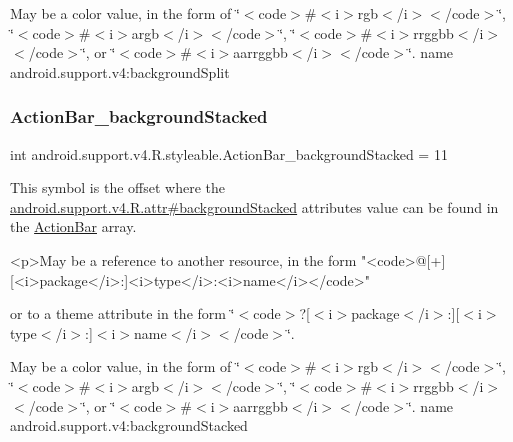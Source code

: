 May be a color value, in the form of \char`\"{}$<$code$>$\#$<$i$>$rgb$<$/i$>$$<$/code$>$\char`\"{}, \char`\"{}$<$code$>$\#$<$i$>$argb$<$/i$>$$<$/code$>$\char`\"{}, \char`\"{}$<$code$>$\#$<$i$>$rrggbb$<$/i$>$$<$/code$>$\char`\"{}, or \char`\"{}$<$code$>$\#$<$i$>$aarrggbb$<$/i$>$$<$/code$>$\char`\"{}.  name android.\+support.\+v4\+:background\+Split \mbox{\label{classandroid_1_1support_1_1v4_1_1R_1_1styleable_aacf7d90f6edcba30a3c2043eec5cef02}} 
\subsubsection{\texorpdfstring{Action\+Bar\+\_\+background\+Stacked}{ActionBar\_backgroundStacked}}
{\footnotesize\ttfamily int android.\+support.\+v4.\+R.\+styleable.\+Action\+Bar\+\_\+background\+Stacked = 11\hspace{0.3cm}{\ttfamily [static]}}

This symbol is the offset where the \hyperlink{classandroid_1_1support_1_1v4_1_1R_1_1attr_af2fc746740dad6cfe275c2ff161399a6}{android.\+support.\+v4.\+R.\+attr\#background\+Stacked} attribute\textquotesingle{}s value can be found in the \hyperlink{classandroid_1_1support_1_1v4_1_1R_1_1styleable_adc5a3492b9c46265760d7120a04d6afa}{Action\+Bar} array.

\begin{DoxyVerb}      <p>May be a reference to another resource, in the form "<code>@[+][<i>package</i>:]<i>type</i>:<i>name</i></code>"
\end{DoxyVerb}
 or to a theme attribute in the form \char`\"{}$<$code$>$?\mbox{[}$<$i$>$package$<$/i$>$\+:\mbox{]}\mbox{[}$<$i$>$type$<$/i$>$\+:\mbox{]}$<$i$>$name$<$/i$>$$<$/code$>$\char`\"{}. 

May be a color value, in the form of \char`\"{}$<$code$>$\#$<$i$>$rgb$<$/i$>$$<$/code$>$\char`\"{}, \char`\"{}$<$code$>$\#$<$i$>$argb$<$/i$>$$<$/code$>$\char`\"{}, \char`\"{}$<$code$>$\#$<$i$>$rrggbb$<$/i$>$$<$/code$>$\char`\"{}, or \char`\"{}$<$code$>$\#$<$i$>$aarrggbb$<$/i$>$$<$/code$>$\char`\"{}.  name android.\+support.\+v4\+:background\+Stacked \mbox{\label{classandroid_1_1support_1_1v4_1_1R_1_1styleable_a8c18998b9778b47903b01c995bc228dd}} 

